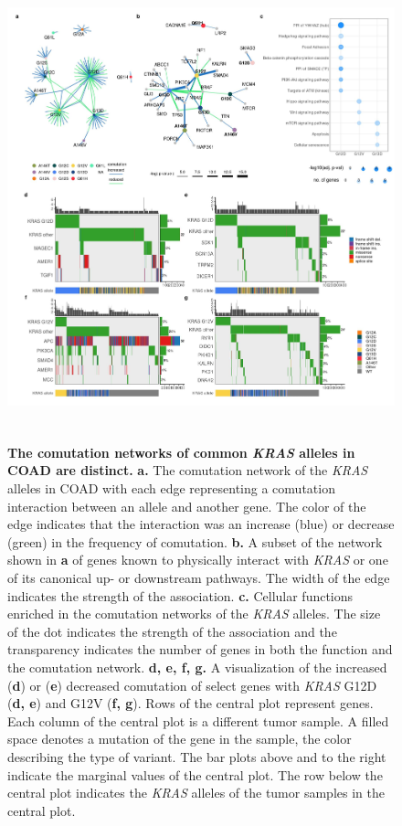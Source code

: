 \documentclass[english, 12pt, letterpaper]{article}
\newcommand{\KRAS}{\emph{KRAS}}
\begin{document}
\begin{figure}[p]
\centering
\includegraphics[height=135mm]{figures/Figure_02.jpeg}
\caption{
    \textbf{The comutation networks of common \KRAS{} alleles in COAD are distinct.}
    \textbf{a.} The comutation network of the \KRAS{} alleles in COAD with each edge representing a comutation interaction between an allele and another gene. The color of the edge indicates that the interaction was an increase (blue) or decrease (green) in the frequency of comutation.
    \textbf{b.} A subset of the network shown in \textbf{a} of genes known to physically interact with \KRAS{} or one of its canonical up- or downstream pathways. The width of the edge indicates the strength of the association.
    \textbf{c.} Cellular functions enriched in the comutation networks of the \KRAS{} alleles. The size of the dot indicates the strength of the association and the transparency indicates the number of genes in both the function and the comutation network.
    \textbf{d, e, f, g.} A visualization of the increased (\textbf{d}) or (\textbf{e}) decreased comutation of select genes with \KRAS{} G12D (\textbf{d, e}) and G12V (\textbf{f, g}). Rows of the central plot represent genes. Each column of the central plot is a different tumor sample. A filled space denotes a mutation of the gene in the sample, the color describing the type of variant. The bar plots above and to the right indicate the marginal values of the central plot. The row below the central plot indicates the \KRAS{} alleles of the tumor samples in the central plot.
}
\label{fig:coad-comutation-main}
\end{figure}
\end{document}
